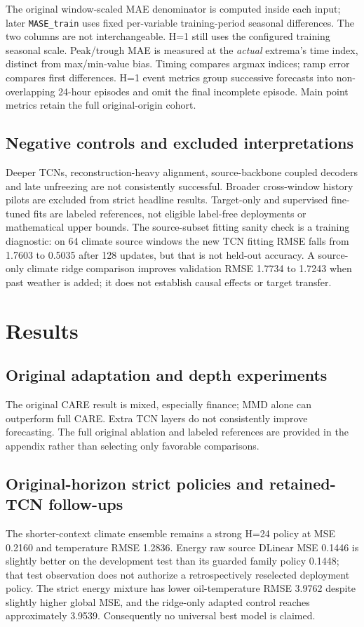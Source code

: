 The original window-scaled MAE denominator is computed inside each input; later \texttt{MASE\_train} uses fixed per-variable training-period seasonal differences. The two columns are not interchangeable. H=1 still uses the configured training seasonal scale. Peak/trough MAE is measured at the \emph{actual} extrema's time index, distinct from max/min-value bias. Timing compares argmax indices; ramp error compares first differences. H=1 event metrics group successive forecasts into non-overlapping 24-hour episodes and omit the final incomplete episode. Main point metrics retain the full original-origin cohort.

\subsection{Negative controls and excluded interpretations}
Deeper TCNs, reconstruction-heavy alignment, source-backbone coupled decoders and late unfreezing are not consistently successful. Broader cross-window history pilots are excluded from strict headline results. Target-only and supervised fine-tuned fits are labeled references, not eligible label-free deployments or mathematical upper bounds. The source-subset fitting sanity check is a training diagnostic: on 64 climate source windows the new TCN fitting RMSE falls from 1.7603 to 0.5035 after 128 updates, but that is not held-out accuracy. A source-only climate ridge comparison improves validation RMSE 1.7734 to 1.7243 when past weather is added; it does not establish causal effects or target transfer.

\section{Results}\label{sec:results}
\subsection{Original adaptation and depth experiments}



The original CARE result is mixed, especially finance; MMD alone can outperform full CARE. Extra TCN layers do not consistently improve forecasting. The full original ablation and labeled references are provided in the appendix rather than selecting only favorable comparisons.

\subsection{Original-horizon strict policies and retained-TCN follow-ups}



The shorter-context climate ensemble remains a strong H=24 policy at MSE 0.2160 and temperature RMSE 1.2836. Energy raw source DLinear MSE 0.1446 is slightly better on the development test than its guarded family policy 0.1448; that test observation does not authorize a retrospectively reselected deployment policy. The strict energy mixture has lower oil-temperature RMSE 3.9762 despite slightly higher global MSE, and the ridge-only adapted control reaches approximately 3.9539. Consequently no universal best model is claimed.

